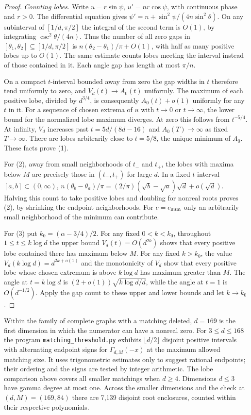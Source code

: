 \begin{proof}
\emph{Counting lobes.}
Write $u=r\sin\psi$, $u'=nr\cos\psi$, with continuous phase and $r>0$.
The differential equation gives
$\psi'=n+\sin^2\psi/(4n\sin^2\theta)$. On any subinterval of
$[1/d,\pi/2]$ the integral of the second term is $O(1)$, by integrating
$\csc^2\theta/(4n)$. Thus the number of all zero gaps in
$[\theta_1,\theta_2]\subseteq[1/d,\pi/2]$ is
$n(\theta_2-\theta_1)/\pi+O(1)$, with half as many positive lobes up
to $O(1)$. The same estimate counts lobes meeting the interval instead
of those contained in it. Each angle gap has length at most $\pi/n$.

On a compact $t$-interval bounded away from zero the gap widths in $t$
therefore tend uniformly to zero, and $V_d(t)\to A_0(t)$ uniformly.
The maximum of each positive lobe, divided by $d^{3/4}$, is consequently
$A_0(t)+o(1)$ uniformly for any $t$ in it. For a sequence of chosen
extrema of $u$ with $t\to0$ or $t\to\infty$, the lower bound for the
normalized lobe maximum diverges. At zero this follows from $t^{-5/4}$.
At infinity, $V_d$ increases past $t=5d/(8d-16)$ and
$A_0(T)\to\infty$ as fixed $T\to\infty$. There are lobes arbitrarily
close to $t=5/8$, the unique minimum of $A_0$. These facts prove (1).

For (2), away from small neighborhoods of $t_-$ and $t_+$, the lobes
with maxima below $M$ are precisely those in $(t_-,t_+)$ for large $d$.
In a fixed $t$-interval $[a,b]\subset(0,\infty)$,
$n(\theta_b-\theta_a)/\pi=(2/\pi)(\sqrt b-\sqrt a)\sqrt d+o(\sqrt d)$.
Halving this count to take positive lobes and doubling for nonreal
roots proves (2), by shrinking the endpoint neighborhoods. For $c=c_{\rm num}$
only an arbitrarily small neighborhood of the minimum can contribute.

For (3) put $k_0=(\alpha-3/4)/2$. For any fixed $0<k<k_0$, throughout
$1\le t\le k\log d$ the upper bound $V_d(t)=O(d^{2k})$ shows that
every positive lobe contained there has maximum below $M$. For any
fixed $k>k_0$, the value
$V_d(k\log d)=d^{2k+o(1)}$ and the monotonicity of $V_d$ show that
every positive lobe whose chosen extremum is above $k\log d$ has
maximum greater than $M$. The angle at $t=k\log d$ is
$(2+o(1))\sqrt{k\log d/d}$, while the angle at $t=1$ is $O(d^{-1/2})$.
Apply the gap count to these upper and lower bounds and let $k\to k_0$.
\end{proof}

Within the family of complete graphs with a matching deleted, $d=169$
is the first dimension in which the numerator can have a nonreal
zero. For $3\le d\le168$ the program \texttt{matching\_threshold.py}
exhibits $\lfloor d/2\rfloor$ disjoint positive intervals with
alternating endpoint signs for $\Gamma_{d,M}(-x)$ at the maximum allowed
matching size. It uses trigonometric estimates only to suggest rational
endpoints; their ordering and the signs are tested by integer arithmetic.
The lobe comparison above covers all smaller matchings when $d\ge4$.
Dimensions $d\le3$ have gamma degree at most one. Across the smaller
dimensions and the check at $(d,M)=(169,84)$ there are 7,139 disjoint
root enclosures, counted within their respective polynomials.

